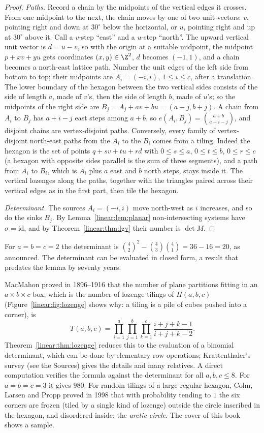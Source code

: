 \begin{proof}
\emph{Paths.} Record a chain by the midpoints of the vertical edges it crosses. From one midpoint to the next, the chain
moves by one of two unit vectors: $v$, pointing right and down at $30^\circ$ below the horizontal, or $u$, pointing right
and up at $30^\circ$ above it. Call a $v$-step ``east'' and a $u$-step ``north''. The upward vertical unit vector is
$d=u-v$, so with the origin at a suitable midpoint, the midpoint $p+xv+yu$ gets coordinates $(x,y)\in\Z^2$, $d$ becomes
$(-1,1)$, and a chain becomes a north-east lattice path. Number the unit edges of the left side from bottom to top; their
midpoints are $A_i=(-i,i)$, $1\le i\le c$, after a translation. The lower boundary of the hexagon between the two
vertical sides consists of the side of length $a$, made of $v$'s, then the side of length $b$, made of $u$'s; so the
midpoints of the right side are $B_j=A_j+av+bu=(a-j,b+j)$. A chain from $A_i$ to $B_j$ has $a+i-j$ east steps among
$a+b$, so $e(A_i,B_j)=\binom{a+b}{a+i-j}$, and disjoint chains are vertex-disjoint paths. Conversely, every family of
vertex-disjoint north-east paths from the $A_i$ to the $B_i$ comes from a tiling. Indeed the hexagon is the set of points
$q+sv+tu+rd$ with $0\le s\le a$, $0\le t\le b$, $0\le r\le c$ (a hexagon with opposite sides parallel is the sum of three
segments), and a path from $A_i$ to $B_i$, which is $A_i$ plus $a$ east and $b$ north steps, stays inside it. The
vertical lozenges along the paths, together with the triangles paired across their vertical edges as in the first part,
then tile the hexagon.

\emph{Determinant.} The sources $A_i=(-i,i)$ move north-west as $i$ increases, and so do the sinks $B_j$. By
Lemma~\ref{linear:lem:planar} non-intersecting systems have $\sigma=\mathrm{id}$, and by Theorem~\ref{linear:thm:lgv} their number is
$\det M$.
\end{proof}

For $a=b=c=2$ the determinant is $\binom42^2-\binom43\binom41=36-16=20$, as announced. The determinant can be evaluated in
closed form, a result that predates the lemma by seventy years.

\begin{remark}
MacMahon proved in 1896--1916 that the number of plane partitions fitting in an $a\times b\times c$ box, which is the
number of lozenge tilings of $H(a,b,c)$ (Figure~\ref{linear:fig:lozenge} shows why: a tiling is a pile of cubes pushed into a
corner), is
\[
T(a,b,c)=\prod_{i=1}^a\prod_{j=1}^b\prod_{k=1}^c\frac{i+j+k-1}{i+j+k-2}.
\]
Theorem~\ref{linear:thm:lozenge} reduces this to the evaluation of a binomial determinant, which can be done by elementary row
operations; Krattenthaler's survey (see the Sources) gives the details and many relatives. A direct computation verifies the
formula against the determinant for all $a,b,c\le8$. For $a=b=c=3$ it gives $980$. For random tilings of a large regular
hexagon, Cohn, Larsen and Propp proved in 1998 that with probability tending to $1$ the six corners are frozen (tiled by
a single kind of lozenge) outside the circle inscribed in the hexagon, and disordered inside: the \emph{arctic circle}.
The cover of this book shows a sample.
\end{remark}


